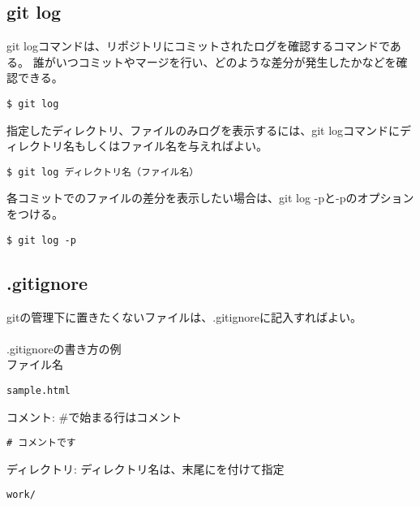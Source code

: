 \documentclass[11pt, oneside]{article}   	%
\begin{document}
\subsection{git log}
git logコマンドは、リポジトリにコミットされたログを確認するコマンドである。
誰がいつコミットやマージを行い、どのような差分が発生したかなどを確認できる。
\begin{lstlisting}
$ git log
\end{lstlisting}

指定したディレクトリ、ファイルのみログを表示するには、git logコマンドにディレクトリ名もしくはファイル名を与えればよい。
\begin{lstlisting}
$ git log ディレクトリ名（ファイル名）
\end{lstlisting}

各コミットでのファイルの差分を表示したい場合は、git log -pと-pのオプションをつける。
\begin{lstlisting}
$ git log -p
\end{lstlisting}

\subsection{.gitignore}
gitの管理下に置きたくないファイルは、.gitignoreに記入すればよい。\\
　\\
.gitignoreの書き方の例\\
ファイル名
\begin{lstlisting}
sample.html
\end{lstlisting}
コメント: \#で始まる行はコメント
\begin{lstlisting}
# コメントです
\end{lstlisting}
ディレクトリ: ディレクトリ名は、末尾に\/を付けて指定
\begin{lstlisting}
work/
\end{lstlisting}
\end{document}
